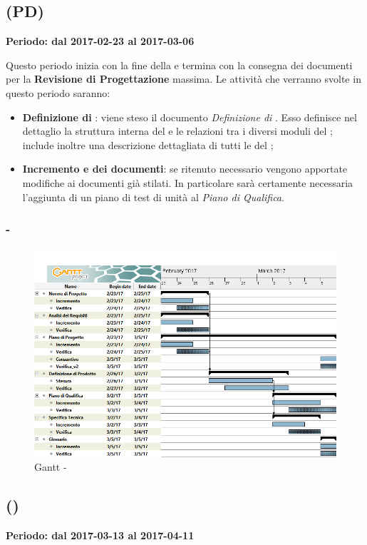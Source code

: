 \documentclass[./PianoDiProgetto.tex]{subfiles}
\begin{document}
  \subsection{\PerPD{} (PD)}
  \textbf{Periodo: dal 2017-02-23 al 2017-03-06}

  Questo periodo inizia con la fine della \PerPA{} e termina con la consegna dei documenti per la \textbf{Revisione di Progettazione} massima. Le attività che verranno svolte in questo periodo saranno:
  \begin{itemize}
    \item \textbf{Definizione di }: viene steso il documento \textit{Definizione di }. Esso definisce nel dettaglio la struttura interna del  e le relazioni tra i diversi moduli del ; include inoltre una descrizione dettagliata di tutti le  del ;
    \item \textbf{Incremento e  dei documenti}: se ritenuto necessario vengono apportate modifiche ai documenti già stilati. In particolare sarà certamente necessaria l'aggiunta di un piano di test di unità al \textit{Piano di Qualifica}.
  \end{itemize}
\newpage
  \subsubsection{ - \PerPD}
    \begin{figure}[!h]
    \centering
    \includegraphics[width=\textwidth]{images/PD}
    \caption{Gantt - \PerPD}
    \end{figure}

  \subsection{\PerC{} ()}
  \textbf{Periodo: dal 2017-03-13 al 2017-04-11}
\end{document}
